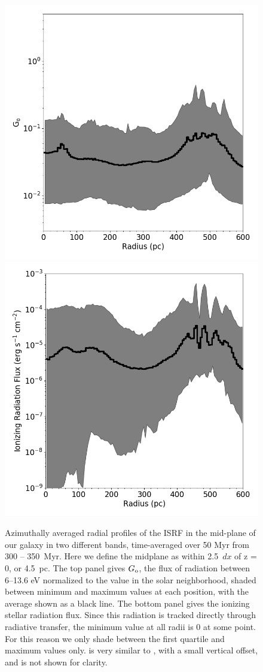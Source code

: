 \documentclass[twocolumn]{aastex61}
\begin{document}
\begin{figure}
\includegraphics[width=0.95\linewidth]{G_o_profile} \\
\includegraphics[width=0.95\linewidth]{ionizing_photon_profile}
\caption{
Azimuthally averaged radial profiles of the ISRF in the mid-plane of our galaxy in two different bands, time-averaged over 50 Myr from 300 -- 350~Myr. Here we define the midplane as within 2.5~$dx$ of z = 0, or 4.5~pc. The top panel gives $G_{\rm o}$, the flux of radiation between 6--13.6 eV normalized to the value in the solar neighborhood, shaded between minimum and maximum values at each position, with the average shown as a black line. The bottom panel gives the  ionizing stellar radiation flux. Since this radiation is tracked directly through radiative transfer, the minimum value at all radii is 0 at some point. For this reason we only shade between the first quartile and maximum values only.  is very similar to , with a small vertical offset, and is not shown for clarity.}

\end{figure}
\end{document}

